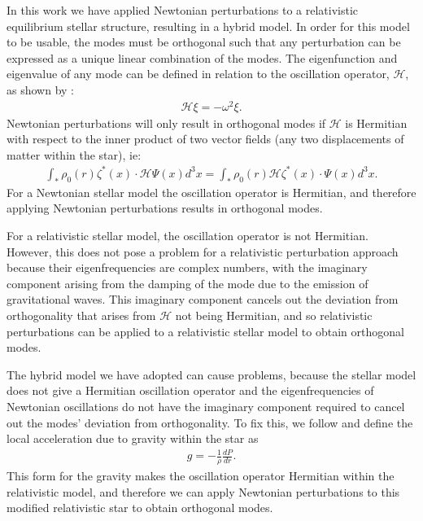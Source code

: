 \documentclass[fleqn,usenatbib]{mnras}
\begin{document}
In this work we have applied Newtonian perturbations to a relativistic equilibrium stellar structure, resulting in a hybrid model. In order for this model to be usable, the modes must be orthogonal such that any perturbation can be expressed as a unique linear combination of the modes. The eigenfunction and eigenvalue of any mode can be defined in relation to the oscillation operator, $\mathcal{H}$, as shown by \citet{reisenegger1994multipole}:
\begin{align}
\mathcal{H}\xi=-\omega^2\xi.
\end{align}
\noindent Newtonian perturbations will only result in orthogonal modes if $\mathcal{H}$ is Hermitian with respect to the inner product of two vector fields (any two displacements of matter within the star), ie:
\begin{align}
\int_*\rho_0(r)\zeta^*(x)\cdot\mathcal{H}\Psi(x)d^3x=\int_*\rho_0(r)\mathcal{H}\zeta^*(x)\cdot\Psi(x)d^3x.
\end{align}
\noindent For a Newtonian stellar model the oscillation operator is Hermitian, and therefore applying Newtonian perturbations results in orthogonal modes. 

For a relativistic stellar model, the oscillation operator is not Hermitian. However, this does not pose a problem for a relativistic perturbation approach \citep[see e.g. ][]{yoshida2002nonradial} because their eigenfrequencies are complex numbers, with the imaginary component arising from the damping of the mode due to the emission of gravitational waves. This imaginary component cancels out the deviation from orthogonality that arises from $\mathcal{H}$ not being Hermitian, and so relativistic perturbations can be applied to a relativistic stellar model to obtain orthogonal modes.

The hybrid model we have adopted can cause problems, because the stellar model does not give a Hermitian oscillation operator and the eigenfrequencies of Newtonian oscillations do not have the imaginary component required to cancel out the modes' deviation from orthogonality. To fix this, we follow \citet{reisenegger1994multipole} and define the local acceleration due to gravity within the star as
\begin{align}
g=-\frac{1}{\rho}\frac{dP}{dr}.
\label{eq:rel_grav}
\end{align}
\noindent This form for the gravity makes the oscillation operator Hermitian within the relativistic model, and therefore we can apply Newtonian perturbations to this modified relativistic star to obtain orthogonal modes. %
\end{document}
